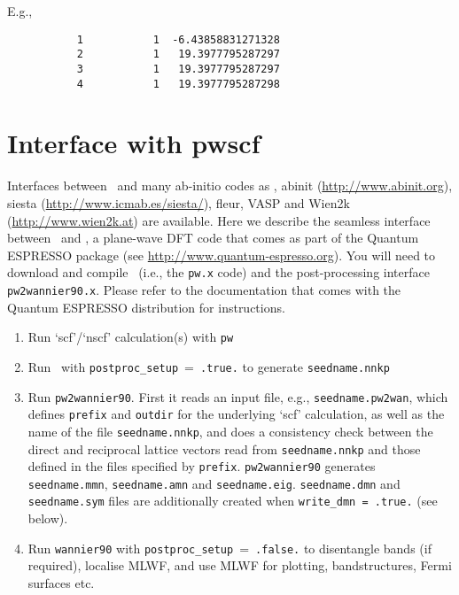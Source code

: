 E.g.,

\begin{verbatim}
           1           1  -6.43858831271328
           2           1   19.3977795287297
           3           1   19.3977795287297
           4           1   19.3977795287298
\end{verbatim}


\section{Interface with {\sc pwscf}}

Interfaces between \wannier\ and many ab-initio codes as \pwscf, 
{\sc abinit} (\url{http://www.abinit.org}),
{\sc siesta} (\url{http://www.icmab.es/siesta/}), 
{\sc fleur}, {\sc VASP} and {\sc Wien2k} (\url{http://www.wien2k.at}) are
available.  Here we describe the
seamless interface between \wannier\ and \pwscf, a
plane-wave DFT code that comes as part of the {\sc Quantum ESPRESSO}
package (see \url{http://www.quantum-espresso.org}).
You will need
to download and compile \pwscf\ (i.e., the {\tt pw.x} code) and the
post-processing interface {\tt pw2wannier90.x}. Please refer to the
documentation that comes with the {\sc Quantum ESPRESSO} distribution
for instructions. 

\begin{enumerate}
\item Run `scf'/`nscf' calculation(s) with \verb#pw#
\item Run \wannier\ with \verb#postproc_setup#~=~\verb#.true.# to
  generate \verb#seedname.nnkp#
\item Run {\tt pw2wannier90}. First it reads an input file, e.g.,
  \verb#seedname.pw2wan#, which defines \verb#prefix# and
  \verb#outdir# for the underlying `scf' calculation, as well as the
  name of the file \verb#seedname.nnkp#, and does a consistency check
  between the direct and reciprocal lattice vectors read from
  \verb#seedname.nnkp# and those defined in the files specified by
  \verb#prefix#. \verb#pw2wannier90# generates \verb#seedname.mmn#,
  \verb#seedname.amn# and \verb#seedname.eig#. 
    \verb#seedname.dmn# and  \verb#seedname.sym# files are additionally created when  
     \verb#write_dmn = .true.# (see below). 
\item Run \verb#wannier90# with \verb#postproc_setup#~=~\verb#.false.# to
  disentangle bands (if required), localise MLWF, and use MLWF for
  plotting, bandstructures, Fermi surfaces etc.
\end{enumerate}

